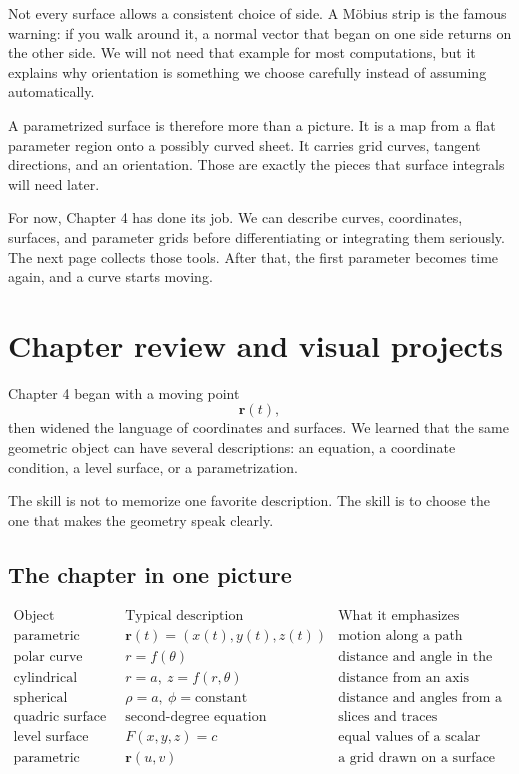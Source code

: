 Not every surface allows a consistent choice of side.  A M\"obius strip is the famous
warning: if you walk around it, a normal vector that began on one side returns on the
other side.  We will not need that example for most computations, but it explains why
orientation is something we choose carefully instead of assuming automatically.

A parametrized surface is therefore more than a picture.  It is a map from a flat
parameter region onto a possibly curved sheet.  It carries grid curves, tangent directions,
and an orientation.  Those are exactly the pieces that surface integrals will need later.

For now, Chapter 4 has done its job.  We can describe curves, coordinates, surfaces,
and parameter grids before differentiating or integrating them seriously.  The next page
collects those tools.  After that, the first parameter becomes time again, and a curve
starts moving.

\section{Chapter review and visual projects}
\label{sec:4.6}

Chapter 4 began with a moving point
\[
    \mathbf r(t),
\]
then widened the language of coordinates and surfaces.  We learned that the same
geometric object can have several descriptions: an equation, a coordinate condition, a
level surface, or a parametrization.

The skill is not to memorize one favorite description.  The skill is to choose the one
that makes the geometry speak clearly.

\subsection{The chapter in one picture}

\[
\begin{array}{c|c|c}
\text{Object} & \text{Typical description} & \text{What it emphasizes} \\ \hline
\text{parametric curve} &
\mathbf r(t)=(x(t),y(t),z(t)) &
\text{motion along a path}\\[1mm]
\text{polar curve} &
r=f(\theta) &
\text{distance and angle in the plane}\\[1mm]
\text{cylindrical surface} &
r=a,\ z=f(r,\theta) &
\text{distance from an axis}\\[1mm]
\text{spherical surface} &
\rho=a,\ \phi=\text{constant} &
\text{distance and angles from a center}\\[1mm]
\text{quadric surface} &
\text{second-degree equation} &
\text{slices and traces}\\[1mm]
\text{level surface} &
F(x,y,z)=c &
\text{equal values of a scalar field}\\[1mm]
\text{parametric surface} &
\mathbf r(u,v) &
\text{a grid drawn on a surface}
\end{array}
\]

